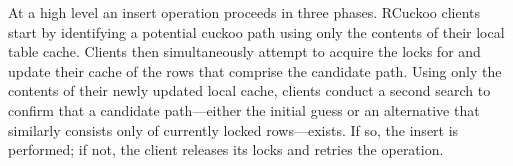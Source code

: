 
At a high level an insert operation proceeds in three phases.  RCuckoo
clients start by identifying a potential cuckoo path using only the
contents of their local table cache.  Clients then simultaneously
attempt to acquire the locks for and update their cache of the rows
that comprise the candidate path.  Using only the contents of their
newly updated local cache, clients conduct a second search to confirm
that a candidate path---either the initial guess or an alternative
that similarly consists only of currently locked rows---exists.  If
so, the insert is performed; if not, the client releases its locks and
retries the operation.

